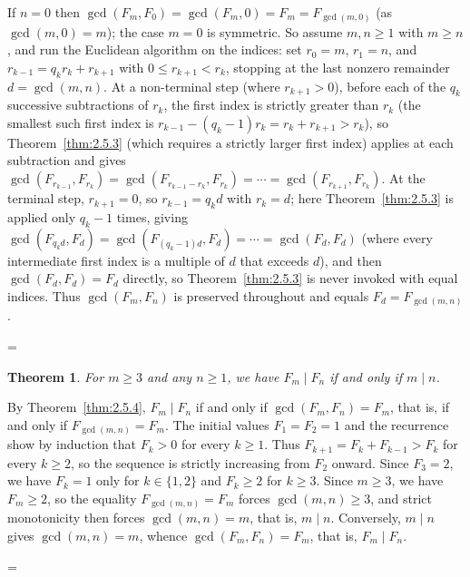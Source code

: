 \documentclass[11pt]{article}
\makeatletter
\theoremstyle{ntstyle}
\newtheorem{theorem}{Theorem}[subsection]
\let\nt@closedisplay\]
\def\nt@guardedclose{\@ifnextchar\par{\nt@closeafterpar}{\@ifnextchar\end{\postdisplaypenalty\@M\nt@closedisplay}{\nt@closedisplay}}}
\def\nt@closeafterpar\par{\@ifnextchar\par{\nt@closeafterpar}{\@ifnextchar\end{\postdisplaypenalty\@M\nt@closedisplay\par}{\nt@closedisplay\par}}}
\renewenvironment{proof}[1][\proofname]{\par
  \pushQED{\qed}\normalfont\topsep\medskipamount\edef\nt@afterproof{\@endparpenalty=\the\@endparpenalty\relax}\@beginparpenalty\@M\@endparpenalty\@M\let\]\nt@guardedclose\trivlist\item[]\textit{#1\@addpunct{.}} \ignorespaces}{\ifvmode\addpenalty\@M\fi\popQED\nt@afterproof\endtrivlist\@endpefalse}
\makeatother
\begin{document}
\begin{proof} If $n = 0$ then $\gcd(F_m, F_0) = \gcd(F_m, 0) = F_m = F_{\gcd(m, 0)}$ (as $\gcd(m, 0) = m$); the case $m
		= 0$ is symmetric. So assume $m, n \ge 1$ with $m \ge n$, and run the Euclidean
	algorithm on the indices: set $r_0 = m$, $r_1 = n$, and $r_{k-1} =
		q_k r_k + r_{k+1}$ with $0 \le r_{k+1} < r_k$, stopping at the last
	nonzero remainder $d = \gcd(m, n)$. At a non-terminal step (where
	$r_{k+1} > 0$), before each of the $q_k$ successive subtractions of $r_k$,
	the first index is strictly greater than $r_k$ (the smallest
	such first index is $r_{k-1} - (q_k-1)r_k = r_k + r_{k+1} >
		r_k$), so Theorem~\ref{thm:2.5.3} (which requires a strictly larger first
	index) applies at each subtraction and gives $\gcd(F_{r_{k-1}}, F_{r_k}) = \gcd(F_{r_{k-1} - r_k}, F_{r_k}) = \cdots =
		\gcd(F_{r_{k+1}}, F_{r_k})$. At the terminal step, $r_{k+1} = 0$, so
	$r_{k-1} = q_k d$ with $r_k = d$; here Theorem~\ref{thm:2.5.3} is applied only
	$q_k - 1$ times, giving $\gcd(F_{q_k d}, F_d) =
		\gcd(F_{(q_k-1)d}, F_d) = \cdots = \gcd(F_d, F_d)$ (where every
	intermediate first index is a multiple of $d$ that exceeds $d$),
	and then $\gcd(F_d, F_d) =
		F_d$ directly, so Theorem~\ref{thm:2.5.3} is never invoked with equal
	indices. Thus $\gcd(F_m, F_n)$ is preserved throughout and equals
	$F_d = F_{\gcd(m, n)}$.

\end{proof}
\begin{theorem}\label{thm:2.5.5} For $m
		\ge 3$ and any $n \ge 1$, we have $F_m \mid F_n$ if and only if $m \mid n$.

\end{theorem}

\begin{proof} By Theorem~\ref{thm:2.5.4}, $F_m \mid F_n$ if and only if
		$\gcd(F_m, F_n) = F_m$, that is, if and only if $F_{\gcd(m, n)} = F_m$. The initial values $F_1 = F_2 = 1$ and the recurrence show by induction that
	$F_k>0$ for every $k\ge1$. Thus
	$F_{k+1} = F_k + F_{k-1} > F_k$ for every $k \ge 2$, so
	the sequence is strictly increasing from $F_2$ onward. Since $F_3 = 2$,
	we have $F_k = 1$ only for $k \in \{1, 2\}$ and $F_k \ge 2$ for $k \ge 3$. Since $m \ge 3$, we have $F_m \ge 2$, so
	the equality $F_{\gcd(m, n)} = F_m$ forces $\gcd(m, n) \ge 3$, and
	strict monotonicity then forces $\gcd(m, n) = m$, that is, $m \mid n$.
	Conversely, $m \mid n$ gives $\gcd(m, n) = m$, whence $\gcd(F_m, F_n)
		= F_m$, that is, $F_m \mid F_n$.

\end{proof}
\end{document}
